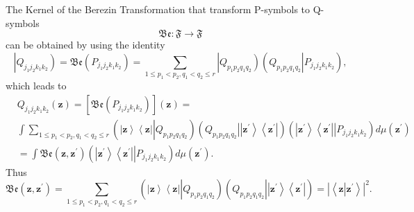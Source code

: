 \documentclass[aps,preprint]{revtex4}%
\begin{document}
The Kernel of the Berezin Transformation that transform P-symbols to
Q-symbols
\begin{equation}
\mathfrak{Be}:\mathfrak{F}\rightarrow\mathfrak{F}%
\end{equation}
can be obtained by using the identity
\begin{equation}
\left\vert Q_{j_{1}j_{2}k_{1}k_{2}}\right)  =\mathfrak{Be}\left(
P_{j_{1}j_{2}k_{1}k_{2}}\right)  =\sum_{1\leq p_{1}<p_{2},q_{1}<q_{2}\leq
r}\left\vert Q_{p_{1}p_{2}q_{1}q_{2}}\right)  \left(  \left.  Q_{p_{1}%
p_{2}q_{1}q_{2}}\right\vert P_{j_{1}j_{2}k_{1}k_{2}}\right)  ,\nonumber
\end{equation}
which leads to%
\begin{align}
&  Q_{j_{1}j_{2}k_{1}k_{2}}\left(  \mathbf{z}\right)  =\left[  \mathfrak{Be}%
\left(  P_{j_{1}j_{2}k_{1}k_{2}}\right)  \right]  \left(  \mathbf{z}\right)
=\nonumber\\
&  \int\sum_{1\leq p_{1}<p_{2},q_{1}<q_{2}\leq r}\left(  \left\vert
\mathbf{z}\right\rangle \left\langle \mathbf{z}\right\vert \left\vert
Q_{p_{1}p_{2}q_{1}q_{2}}\right.  \right)  \left(  Q_{p_{1}p_{2}q_{1}q_{2}%
}\left\vert \left\vert \mathbf{z}^{\prime}\right\rangle \left\langle
\mathbf{z}^{\prime}\right\vert \right.  \right)  \left(  \left.  \left\vert
\mathbf{z}^{\prime}\right\rangle \left\langle \mathbf{z}^{\prime}\right\vert
\right\vert P_{j_{1}j_{2}k_{1}k_{2}}\right)  d\mu\left(  \mathbf{z}^{\prime
}\right) \nonumber\\
&  =\int\mathfrak{Be}\left(  \mathbf{z,z}^{\prime}\right)  \left(  \left\vert
\mathbf{z}^{\prime}\right\rangle \left\langle \mathbf{z}^{\prime}\right\vert
\left\vert P_{j_{1}j_{2}k_{1}k_{2}}\right.  \right)  d\mu\left(
\mathbf{z}^{\prime}\right)  .
\end{align}
Thus
\begin{equation}
\mathfrak{Be}\left(  \mathbf{z,z}^{\prime}\right)  =\sum_{1\leq p_{1}%
<p_{2},q_{1}<q_{2}\leq r}\left(  \left\vert \mathbf{z}\right\rangle
\left\langle \mathbf{z}\right\vert \left\vert Q_{p_{1}p_{2}q_{1}q_{2}}\right.
\right)  \left(  \left.  Q_{p_{1}p_{2}q_{1}q_{2}}\right\vert \left\vert
\mathbf{z}^{\prime}\right\rangle \left\langle \mathbf{z}^{\prime}\right\vert
\right)  =\left\vert \left\langle \mathbf{z}\left\vert \mathbf{z}^{\prime
}\right.  \right\rangle \right\vert ^{2}.
\end{equation}
\end{document}
